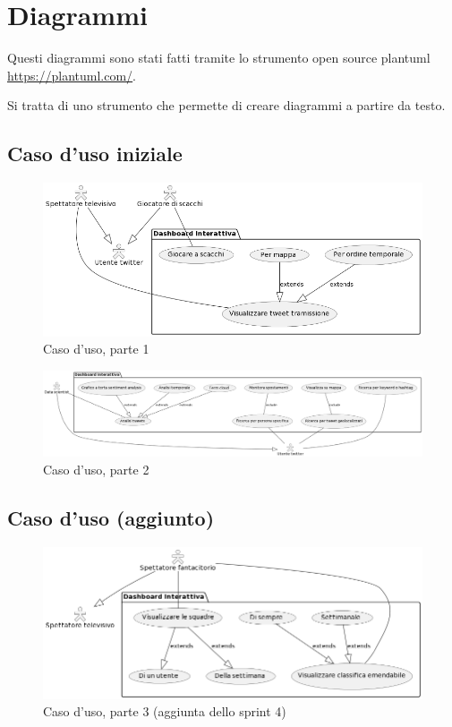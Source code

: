 \documentclass{article}
\begin{document}
\section{ Diagrammi }
Questi diagrammi sono stati fatti tramite lo strumento open source plantuml \href{https://plantuml.com/}{https://plantuml.com/}. 

Si tratta di uno strumento che permette di creare diagrammi a partire da testo.
\subsection{Caso d'uso iniziale}
\begin{figure}[H]
    \centering
    \includegraphics[scale=0.40]{diagrammi/usecaseEpiche.png}
    \caption{Caso d'uso, parte 1}
    \label{fig:usecase1}
\end{figure}
\begin{figure}[H]
    \centering
    \includegraphics[scale=0.30]{diagrammi/usecaseScenario.png}
    \caption{Caso d'uso, parte 2}
    \label{fig:usecase2}
\end{figure}
\subsection{Caso d'uso (aggiunto)}
\begin{figure}[H]
    \centering
    \includegraphics[scale=0.40]{diagrammi/usecaseAggiunta.png}
    \caption{Caso d'uso, parte 3 (aggiunta dello sprint 4)}
    \label{fig:usecase2}
\end{figure}
\end{document}
